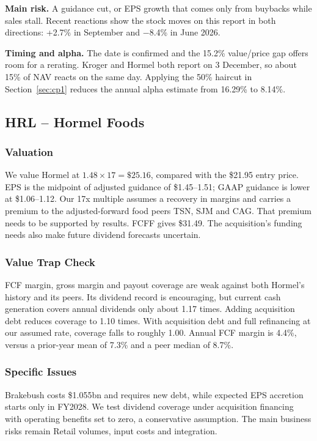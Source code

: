 \documentclass[10pt,a4paper]{article}
\begin{document}
\textbf{Main risk.} A guidance cut, or EPS growth that comes only from buybacks while sales stall. Recent reactions show the stock moves on this report in both directions: +2.7\% in September and $-$8.4\% in June 2026.

\textbf{Timing and alpha.} The date is confirmed and the 15.2\% value/price gap offers room for a rerating. Kroger and Hormel both report on 3 December, so about 15\% of NAV reacts on the same day. Applying the 50\% haircut in Section~\ref{sec:cp1} reduces the annual alpha estimate from 16.29\% to 8.14\%.

\subsection{HRL -- Hormel Foods}

\subsubsection*{Valuation}
We value Hormel at $1.48\times17=\$25.16$, compared with the \$21.95 entry price. EPS is the midpoint of adjusted guidance of \$1.45--1.51; GAAP guidance is lower at \$1.06--1.12. Our 17x multiple assumes a recovery in margins and carries a premium to the adjusted-forward food peers TSN, SJM and CAG. That premium needs to be supported by results. FCFF gives \$31.49. The acquisition's funding needs also make future dividend forecasts uncertain.

\subsubsection*{Value Trap Check}
FCF margin, gross margin and payout coverage are weak against both Hormel's history and its peers. Its dividend record is encouraging, but current cash generation covers annual dividends only about 1.17 times. Adding acquisition debt reduces coverage to 1.10 times. With acquisition debt and full refinancing at our assumed rate, coverage falls to roughly 1.00. Annual FCF margin is 4.4\%, versus a prior-year mean of 7.3\% and a peer median of 8.7\%.

\subsubsection*{Specific Issues}
Brakebush costs \$1.055bn and requires new debt, while expected EPS accretion starts only in FY2028. We test dividend coverage under acquisition financing with operating benefits set to zero, a conservative assumption. The main business risks remain Retail volumes, input costs and integration.
\end{document}
